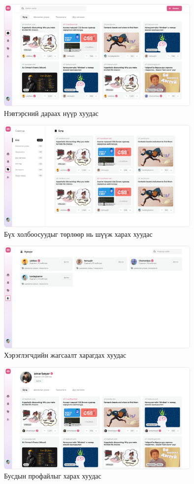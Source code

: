 \begin{figure}[h]
	\centering
	\includegraphics[width=10cm]{images/interfaces/home-screen.png}
	\caption{Нэвтэрсний дараах нүүр хуудас}
	\label{fig:homescreen}
\end{figure}

\begin{figure}[h]
	\centering
	\includegraphics[width=10cm]{images/interfaces/topics.png}
	\caption{Бүх холбоосуудыг төрлөөр нь шүүж харах хуудас}
	\label{fig:topics}
\end{figure}

\begin{figure}[h]
	\centering
	\includegraphics[width=10cm]{images/interfaces/people.png}
	\caption{Хэрэглэгчдийн жагсаалт харагдах хуудас}
	\label{fig:people}
\end{figure}

\begin{figure}[h]
	\centering
	\includegraphics[width=10cm]{images/interfaces/profile.png}
	\caption{Бусдын профайлыг харах хуудас}
	\label{fig:profile}
\end{figure}

